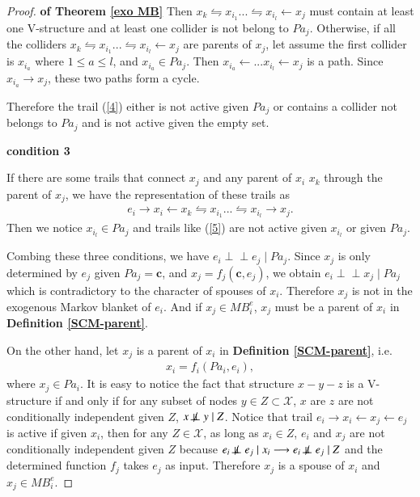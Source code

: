 \documentclass[twoside,11pt]{article}
\begin{document}
\begin{proof}{\textbf{of Theorem \ref{exo MB}}}
Then $x_k \leftrightharpoons x_{i_1}... \leftrightharpoons x_{i_l}\gets x_j$ must contain at least one V-structure and at least one collider is not belong to $Pa_j$. Otherwise, if all the colliders $x_k \leftrightharpoons x_{i_1}... \leftrightharpoons x_{i_l}\gets x_j$ are parents of $x_j$, let assume the first collider is $x_{i_a}$ where $1\leq a\leq l$, and $x_{i_a}\in Pa_j$. Then $x_{i_a}\gets ... x_{i_l}\gets x_j$ is a path. Since $x_{i_a}\to x_j$, these two paths form a cycle.


Therefore the trail (\ref{4}) either is not active given $Pa_j$ or contains a collider not belongs to $Pa_j$ and is not active given the empty set. 

\textbf{condition 3}

If there are some trails that connect $x_j$ and any parent of $x_i$ $x_k$ through the parent of $x_j$, we have the representation of these trails as
\begin{align}\label{5}
e_i\to x_i\gets x_k \leftrightharpoons x_{i_1}... \leftrightharpoons x_{i_l}\to x_j.
\end{align}
Then we notice $x_{i_l}\in Pa_j$ and trails like (\ref{5}) are not active given $x_{i_l}$ or given $Pa_j$.

Combing these three conditions, we have $e_i\perp\!\!\!\perp e_j\mid Pa_j$. Since $x_j$ is only determined by $e_j$ given $Pa_j=\mathbf c$, and $x_j=f_j(\mathbf c, e_j)$, we obtain $e_i\perp\!\!\!\perp x_j\mid Pa_j$ which is contradictory to the character of spouses of $x_i$. Therefore $x_j$ is not in the exogenous Markov blanket of $e_i$. And if $x_j\in MB^e_i$, $x_j$ must be a parent of $x_i$ in \textbf{Definition \ref{SCM-parent}}.

On the other hand, let $x_j$ is a parent of $x_i$ in \textbf{Definition \ref{SCM-parent}}, i.e.
\begin{align*}
x_i=f_i(Pa_i,e_i),
\end{align*}
where $x_j\in Pa_i$. It is easy to notice the fact that structure $x-y-z$ is a V-structure if and only if for any subset of nodes $y\in Z\subset\mathcal X$, $x$ are $z$ are not conditionally independent given $Z$, $x\not\!\perp\!\!\!\perp y\mid Z$. Notice that trail $e_i\to x_i\gets x_j\gets e_j$ is active if given $x_i$, then for any $Z\in\mathcal X$, as long as $x_i\in Z$, $e_i$ and $x_j$ are not conditionally independent given $Z$ because $e_i\not\!\perp\!\!\!\perp e_j\mid x_i\longrightarrow e_i\not\!\perp\!\!\!\perp e_j\mid Z$ and the determined function $f_j$ takes $e_j$ as input. Therefore $x_j$ is a spouse of $x_i$ and $x_j\in MB^e_i$.

\end{proof}
\end{document}
